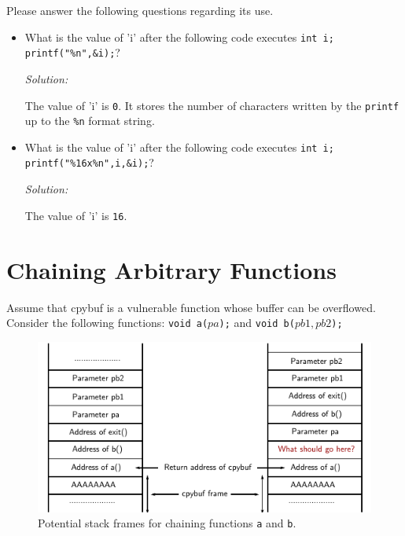 \documentclass[a4paper,11pt]{article}
\newenvironment{solution}%
{\par{\noindent\small\textit{Solution:}}\vspace{-12pt}\begin{framed}}%
{\end{framed}\par}
\begin{document}
\noindent Please answer the following questions regarding its use.

\begin{itemize}
\item What is the value of 'i' after the following code executes \texttt{int i;
    printf("\%n",\&i);}?  

\ifsolution
\begin{solution}
The value of 'i' is \texttt{0}. It stores the number of characters written by the \texttt{printf}
up to the \texttt{\%n} format string. 
\end{solution}\fi
\item What is the value of 'i' after the following code executes \texttt{int i;
    printf("\%16x\%n",i,\&i);}?
\ifsolution\begin{solution}
The value of 'i' is \texttt{16}.
\end{solution}\fi
\end{itemize}

\section*{Chaining Arbitrary Functions}
Assume that cpybuf is a vulnerable function whose buffer can be
overflowed. Consider the following functions: \texttt{void a(\(pa\));} and
\texttt{void b(\(pb1, pb2\));} 

\begin{figure}[t]
    \centering
    \includegraphics[width=0.8\linewidth]{./stacks.pdf}
    \caption{Potential stack frames for chaining functions \texttt{a} and \texttt{b}.}
    \label{fig:stacks}
\end{figure}
\end{document}
